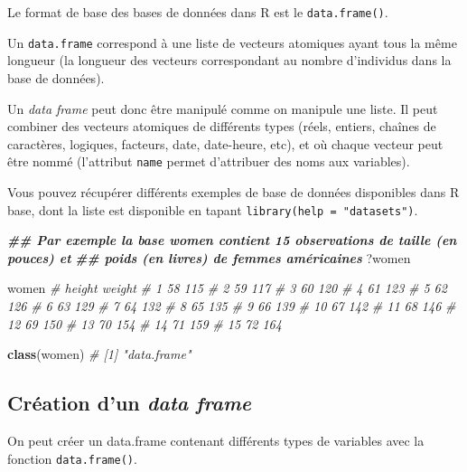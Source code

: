 \documentclass[
]{book}
\newenvironment{Shaded}{\begin{snugshade}}{\end{snugshade}}
\newcommand{\CommentTok}[1]{\textcolor[rgb]{0.56,0.35,0.01}{\textit{#1}}}
\newcommand{\DocumentationTok}[1]{\textcolor[rgb]{0.56,0.35,0.01}{\textbf{\textit{#1}}}}
\newcommand{\FunctionTok}[1]{\textcolor[rgb]{0.13,0.29,0.53}{\textbf{#1}}}
\newcommand{\NormalTok}[1]{#1}
\begin{document}
Le format de base des bases de données dans R est le \texttt{data.frame()}.

Un \texttt{data.frame} correspond à une liste de vecteurs atomiques ayant tous la même longueur (la longueur des vecteurs correspondant au nombre d'individus dans la base de données).

Un \emph{data frame} peut donc être manipulé comme on manipule une liste. Il peut combiner des vecteurs atomiques de différents types (réels, entiers, chaînes de caractères, logiques, facteurs, date, date-heure, etc), et où chaque vecteur peut être nommé (l'attribut \texttt{name} permet d'attribuer des noms aux variables).

Vous pouvez récupérer différents exemples de base de données disponibles dans R base, dont la liste est disponible en tapant \texttt{library(help\ =\ "datasets")}.

\begin{Shaded}
\begin{Highlighting}[]
\DocumentationTok{\#\# Par exemple la base \textquotesingle{}women\textquotesingle{} contient 15 observations de taille (en pouces) et }
\DocumentationTok{\#\# poids (en livres) de femmes américaines}
\NormalTok{?women}

\NormalTok{women}
\CommentTok{\#    height weight}
\CommentTok{\# 1      58    115}
\CommentTok{\# 2      59    117}
\CommentTok{\# 3      60    120}
\CommentTok{\# 4      61    123}
\CommentTok{\# 5      62    126}
\CommentTok{\# 6      63    129}
\CommentTok{\# 7      64    132}
\CommentTok{\# 8      65    135}
\CommentTok{\# 9      66    139}
\CommentTok{\# 10     67    142}
\CommentTok{\# 11     68    146}
\CommentTok{\# 12     69    150}
\CommentTok{\# 13     70    154}
\CommentTok{\# 14     71    159}
\CommentTok{\# 15     72    164}

\FunctionTok{class}\NormalTok{(women)}
\CommentTok{\# [1] "data.frame"}
\end{Highlighting}
\end{Shaded}

\subsection{\texorpdfstring{Création d'un \emph{data frame}}{Création d'un data frame}}\label{cruxe9ation-dun-data-frame}

On peut créer un data.frame contenant différents types de variables avec la fonction \texttt{data.frame()}.
\end{document}
